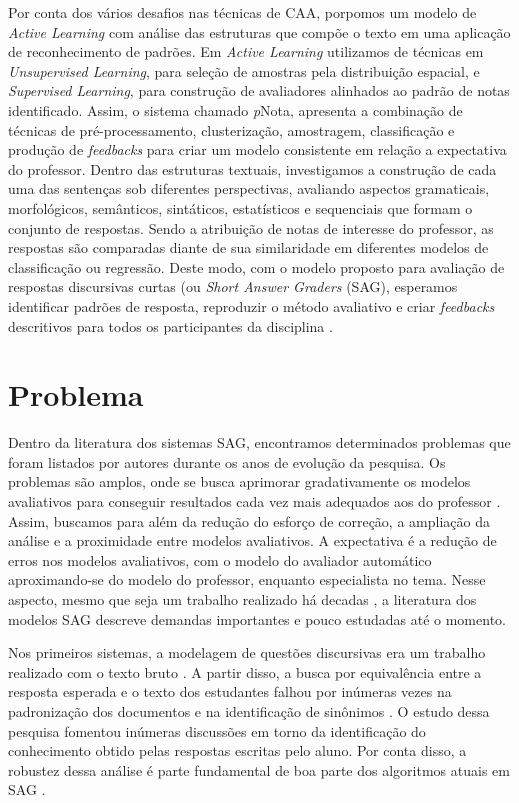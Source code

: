 Por conta dos vários desafios nas técnicas de CAA, porpomos um modelo de \textit{Active Learning} com análise das estruturas que compõe o texto em uma aplicação de reconhecimento de padrões. Em \textit{Active Learning} utilizamos de técnicas em \textit{Unsupervised Learning}, para seleção de amostras pela distribuição espacial, e \textit{Supervised Learning}, para construção de avaliadores alinhados ao padrão de notas identificado. Assim, o sistema chamado \textit{p}Nota, apresenta a combinação de técnicas de pré-processamento, clusterização, amostragem, classificação e produção de \textit{feedbacks} para criar um modelo consistente em relação a expectativa do professor. Dentro das estruturas textuais, investigamos a construção de cada uma das sentenças sob diferentes perspectivas, avaliando aspectos gramaticais, morfológicos, semânticos, sintáticos, estatísticos e sequenciais que formam o conjunto de respostas. Sendo a atribuição de notas de interesse do professor, as respostas são comparadas diante de sua similaridade em diferentes modelos de classificação ou regressão. Deste modo, com o modelo proposto para avaliação de respostas discursivas curtas (ou \textit{Short Answer Graders} (SAG), esperamos identificar padrões de resposta, reproduzir o método avaliativo e criar \textit{feedbacks} descritivos para todos os participantes da disciplina \cite{arter2006, spalenza2016a}.

\section{Problema} 
\label{cap1-problema}

Dentro da literatura dos sistemas SAG, encontramos determinados problemas que foram listados por autores durante os anos de evolução da pesquisa. Os problemas são amplos, onde se busca aprimorar gradativamente os modelos avaliativos para conseguir resultados cada vez mais adequados aos do professor \cite{pado2021}. Assim, buscamos para além da redução do esforço de correção, a ampliação da análise e a proximidade entre modelos avaliativos. A expectativa é a redução de erros nos modelos avaliativos, com o modelo do avaliador automático aproximando-se do modelo do professor, enquanto especialista no tema. Nesse aspecto, mesmo que seja um trabalho realizado há decadas \cite{burrows2015}, a literatura dos modelos SAG descreve demandas importantes e pouco estudadas até o momento.

Nos primeiros sistemas, a modelagem de questões discursivas era um trabalho realizado com o texto bruto \cite{perez-marin2009}. A partir disso, a busca por equivalência entre a resposta esperada e o texto dos estudantes falhou por inúmeras vezes na padronização dos documentos e na identificação de sinônimos \cite{leffa2003}. O estudo dessa pesquisa fomentou inúmeras discussões em torno da identificação do conhecimento obtido pelas respostas escritas pelo aluno. Por conta disso, a robustez dessa análise é parte fundamental de boa parte dos algoritmos atuais em SAG \cite{filighera2020}.

